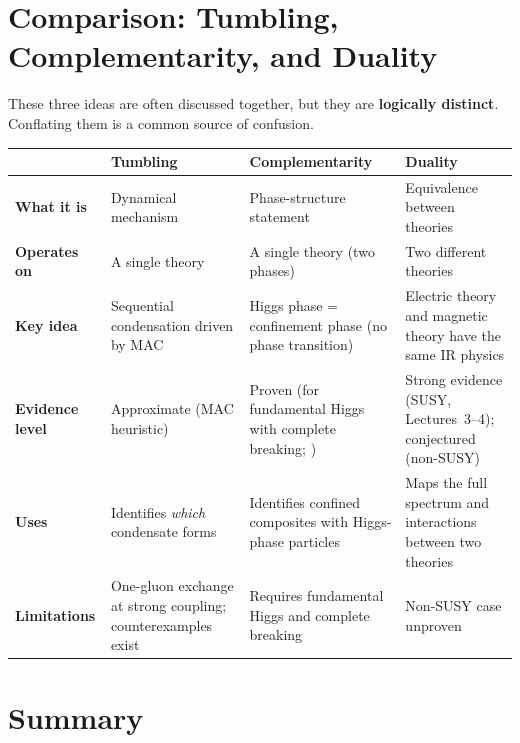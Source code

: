 \documentclass[11pt,a4paper]{article}
\begin{document}
\section{Comparison: Tumbling, Complementarity, and Duality}
\label{sec:comparison}

\begin{comparisontable}[title={Three distinct concepts}]
These three ideas are often discussed together, but they are
\textbf{logically distinct}.  Conflating them is a common source of
confusion.

\renewcommand{\arraystretch}{1.5}
\begin{tabular}{@{} >{\raggedright}p{3cm} p{3.5cm} p{3.5cm} p{3.5cm} @{}}
\toprule
& \textbf{Tumbling} & \textbf{Complementarity} & \textbf{Duality} \\
\midrule
\textbf{What it is}
  & Dynamical mechanism
  & Phase-structure statement
  & Equivalence between theories \\
\textbf{Operates on}
  & A single theory
  & A single theory (two phases)
  & Two different theories \\
\textbf{Key idea}
  & Sequential condensation driven by MAC
  & Higgs phase = confinement phase (no phase transition)
  & Electric theory and magnetic theory have the same IR physics \\
\textbf{Evidence level}
  & Approximate (MAC heuristic)
  & Proven (for fundamental Higgs with complete breaking;
    \cite{FS1979})
  & Strong evidence (SUSY, Lectures~3--4); conjectured (non-SUSY) \\
\textbf{Uses}
  & Identifies \emph{which} condensate forms
  & Identifies confined composites with Higgs-phase particles
  & Maps the full spectrum and interactions between two theories \\
\textbf{Limitations}
  & One-gluon exchange at strong coupling; counterexamples exist
  & Requires fundamental Higgs and complete breaking
  & Non-SUSY case unproven \\
\bottomrule
\end{tabular}
\end{comparisontable}


\section{Summary}
\label{sec:summary}
\end{document}

